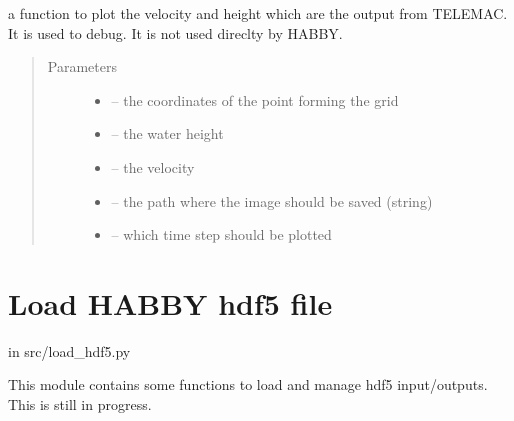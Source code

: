 \documentclass[letterpaper,10pt,english]{sphinxmanual}
\begin{document}

\begin{fulllineitems}
\label{\detokenize{index:src.selafin_habby1.plot_vel_h}}
a function to plot the velocity and height which are the output from TELEMAC. It is used to debug.
It is not used direclty by HABBY.
\begin{quote}\begin{description}
\item[{Parameters}] \leavevmode\begin{itemize}
\item {} 
 -- the coordinates of the point forming the grid

\item {} 
 -- the  water height

\item {} 
 -- the velocity

\item {} 
 -- the path where the image should be saved (string)

\item {} 
 -- which time step should be plotted

\end{itemize}

\end{description}\end{quote}

\end{fulllineitems}



\section{Load HABBY hdf5 file}
\label{\detokenize{index:load-habby-hdf5-file}}
in src/load\_hdf5.py

This module contains some functions to load and manage hdf5 input/outputs. This is still in progress.
\label{\detokenize{index:module-src.load_hdf5}}
\end{document}
